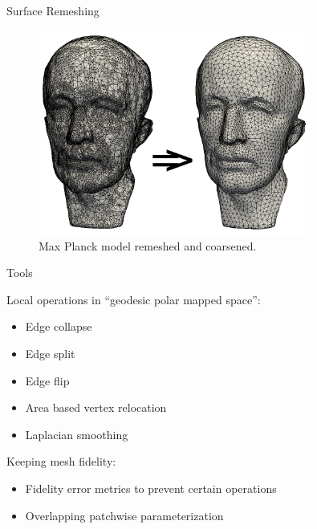 \documentclass{beamer}
\begin{document}
\begin{frame}[plain]{Surface Remeshing}

  \begin{figure}
    \includegraphics[width=0.8\textwidth]{../image/mp.png}
    \caption*{Max Planck model remeshed and coarsened.}
  \end{figure}

\end{frame}

\begin{frame}[plain]{Tools}

  Local operations in ``geodesic polar mapped space'':
  \begin{itemize}
  \item Edge collapse
  \item Edge split
  \item Edge flip
  \item Area based vertex relocation
  \item Laplacian smoothing  
  \end{itemize}

  \vspace{0.5cm}

  Keeping mesh fidelity:
  \begin{itemize}
  \item Fidelity error metrics to prevent certain operations
  \item Overlapping patchwise parameterization
  \end{itemize}
  
\end{frame}
\end{document}
